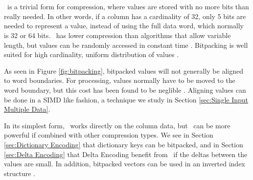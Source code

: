 \section{\bp}
\label{sec:Bitpacking}

\bp~is a trivial form for compression, where values are stored with no more bits than really needed. In other words, if a column has a cardinality of 32, only 5 bits are needed to represent a value, instead of using the full data word, which normally is 32 or 64 bits. \bp~has lower compression than algorithms that allow variable length, but values can be randomly accessed in constant time \cite{Raman2008-gi, Willhalm2013-ri}. Bitpacking is well suited for high cardinality, uniform distribution of values \cite{Holloway2008-rr}.

As seen in Figure \ref{fig:bitpacking}, bitpacked values will not generally be aligned to word boundaries. For processing, values normally have to be moved to the word boundary, but this cost has been found to be neglible \cite{Holloway2008-rr}. Aligning values can be done in a SIMD like fashion, a technique we study in Section \ref{sec:Single Input Multiple Data}.

In its simplest form, \bp~works directly on the column data, but \bp~can be more powerful if combined with other compression types. We see in Section \ref{sec:Dictionary Encoding} that dictionary keys can be bitpacked, and in Section \ref{sec:Delta Encoding} that Delta Encoding benefit from \bp~if the deltas between the values are small. In addition, bitpacked vectors can be used in an inverted index structure \cite{Schwalb2014-hn}.

